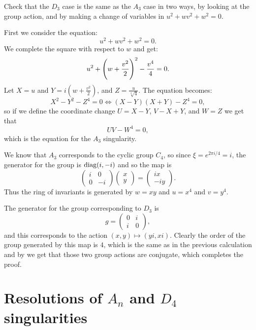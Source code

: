 \documentclass[11pt, a4paper]{article}
\begin{document}
\begin{exercise}
  Check that the $D_3$ case is the same as the $A_3$ case in two ways,
  by looking at the group action, and by making a change of variables in
  $u^2 + wv^2 + w^2 = 0$.
\end{exercise}
\begin{solution}
  First we consider the equation:
  \[
    u^2 + wv^2 + w^2 = 0.
  \]
  We complete the square with respect to $w$ and get:
  \[
    u^2 + \del{w + \frac{v^2}{2}}^2 - \frac{v^4}{4} = 0.
  \]
  Let $X = u$ and $Y = i(w + \frac{v^2}{2})$, and $Z = \frac{u}{\sqrt[4]{4}}$.
  The equation becomes:
  \[
    X^2 - Y^2 - Z^4 = 0 \iff
    (X - Y)(X + Y) - Z^4 = 0,
  \]
  so if we define the coordinate change $U = X - Y$,
  $V - X + Y$, and $W = Z$ we get that
  \[
    UV - W^4 = 0,
  \]
  which is the equation for the $A_3$ singularity.

  We know that $A_3$ corresponds to the cyclic group $C_4$,
  so since $\xi = e^{2\pi i /4} = i$, the generator for the group
  is $\operatorname{diag}(i,-i)$ and so the map is
  \[
    \begin{pmatrix}
      i & 0 \\
      0 & -i
    \end{pmatrix}
    \begin{pmatrix}
      x \\ y
    \end{pmatrix} =
    \begin{pmatrix}
      ix \\ -iy
    \end{pmatrix}.
  \]
  Thus the ring of invariants is generated
  by $w = xy$ and $u = x^4$ and $v = y^4$.

  The generator for the group corresponding to $D_3$
  is
  \[
    g =
    \begin{pmatrix}
      0 & i \\
      i & 0
    \end{pmatrix},
  \]
  and this corresponds to the action $(x,y) \mapsto (yi,xi)$.
  Clearly the order of the group generated by this map is $4$,
  which is the same as in the previous calculation
  and by  we get that
  those two group actions are conjugate, which completes the proof.
\end{solution}

\newpage

\section{Resolutions of \texorpdfstring{$A_n$}{An} and \texorpdfstring{$D_4$}{D4}
singularities}
\end{document}
